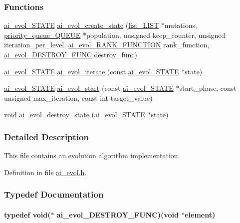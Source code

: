 \subsubsection*{Functions}
\begin{DoxyCompactItemize}
\item 
\hyperlink{a00003}{ai\-\_\-evol\-\_\-\-S\-T\-A\-T\-E} \hyperlink{a00008_a61910738e890b3251c61720e54b6d18c}{ai\-\_\-evol\-\_\-create\-\_\-state} (\hyperlink{a00004}{list\-\_\-\-L\-I\-S\-T} $\ast$mutations, \hyperlink{a00007}{priority\-\_\-queue\-\_\-\-Q\-U\-E\-U\-E} $\ast$population, unsigned keep\-\_\-counter, unsigned iteration\-\_\-per\-\_\-level, \hyperlink{a00008_a40f90c3ffcebe63f84cf844eea9167c5}{ai\-\_\-evol\-\_\-\-R\-A\-N\-K\-\_\-\-F\-U\-N\-C\-T\-I\-O\-N} rank\-\_\-function, \hyperlink{a00008_a6710253499441c289fb8751c83221e38}{ai\-\_\-evol\-\_\-\-D\-E\-S\-T\-R\-O\-Y\-\_\-\-F\-U\-N\-C} destroy\-\_\-func)
\item 
\hyperlink{a00003}{ai\-\_\-evol\-\_\-\-S\-T\-A\-T\-E} \hyperlink{a00008_a97a06b871a13fd905db646fe0b696e0a}{ai\-\_\-evol\-\_\-iterate} (const \hyperlink{a00003}{ai\-\_\-evol\-\_\-\-S\-T\-A\-T\-E} $\ast$state)
\item 
\hyperlink{a00003}{ai\-\_\-evol\-\_\-\-S\-T\-A\-T\-E} \hyperlink{a00008_ab85b84d8921124d6e274dc719a3f79e5}{ai\-\_\-evol\-\_\-start} (const \hyperlink{a00003}{ai\-\_\-evol\-\_\-\-S\-T\-A\-T\-E} $\ast$start\-\_\-phase, const unsigned max\-\_\-iteration, const int target\-\_\-value)
\item 
void \hyperlink{a00008_ac058af5bcdd4f88db91b9b1c2ee08d91}{ai\-\_\-evol\-\_\-destroy\-\_\-state} (\hyperlink{a00003}{ai\-\_\-evol\-\_\-\-S\-T\-A\-T\-E} $\ast$state)
\end{DoxyCompactItemize}


\subsubsection{Detailed Description}
This file contains an evolution algorithm implementation. 

Definition in file \hyperlink{a00008_source}{ai\-\_\-evol.\-h}.



\subsubsection{Typedef Documentation}
\hypertarget{a00008_a6710253499441c289fb8751c83221e38}{
\paragraph[{ai\-\_\-evol\-\_\-\-D\-E\-S\-T\-R\-O\-Y\-\_\-\-F\-U\-N\-C}]{\setlength{\rightskip}{0pt plus 5cm}typedef void($\ast$ ai\-\_\-evol\-\_\-\-D\-E\-S\-T\-R\-O\-Y\-\_\-\-F\-U\-N\-C)(void $\ast$element)}}\label{a00008_a6710253499441c289fb8751c83221e38}


